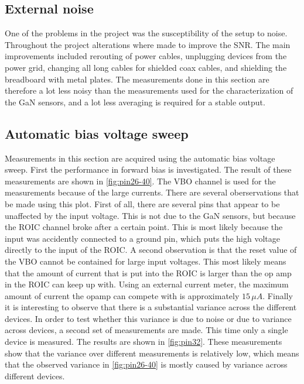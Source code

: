 \subsection{External noise}
One of the problems in the project was the susceptibility of the setup to noise. Throughout the project alterations where made to improve the SNR. The main improvements included rerouting of power cables, unplugging devices from the power grid, changing all long cables for shielded coax cables, and shielding the breadboard with metal plates. The measurements done in this section are therefore a lot less noisy than the measurements used for the characterization of the GaN sensors, and a lot less averaging is required for a stable output. 

\subsection{Automatic bias voltage sweep}\label{ssec:automatic_bias_voltage_sweep}
Measurements in this section are acquired using the automatic bias voltage sweep. First the performance in forward bias is investigated. The result of these measurements are shown in \cref{fig:pin26-40}. The VBO channel is used for the measurements because of the large currents. There are several oberservations that be made using this plot. First of all, there are several pins that appear to be unaffected by the input voltage. This is not due to the GaN sensors, but because the ROIC channel broke after a certain point. This is most likely because the input was accidently connected to a ground pin, which puts the high voltage directly to the input of the ROIC. A second observation is that the reset value of the VBO cannot be contained for large input voltages. This most likely means that the amount of current that is put into the ROIC is larger than the op amp in the ROIC can keep up with. Using an external current meter, the maximum amount of current the opamp can compete with is approximately $15\,\mu A$. Finally it is interesting to observe that there is a substantial variance across the different devices. In order to test whether this variance is due to noise or due to variance across devices, a second set of measurements are made. This time only a single device is measured. The results are shown in \cref{fig:pin32}. These measurements show that the variance over different measurements is relatively low, which means that the observed variance in \cref{fig:pin26-40} is mostly caused by variance across different devices.


